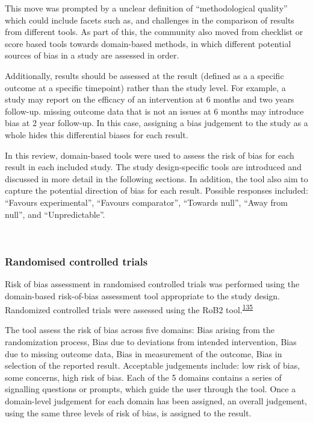 \documentclass[a4paper, twoside]{templates/ociamthesis}
\begin{document}
This move was prompted by a unclear definition of ``methodological quality'' which could include facets such as, and challenges in the comparison of results from different tools. As part of this, the community also moved from checklist or score based tools towards domain-based methods, in which different potential sources of bias in a study are assessed in order.

Additionally, results should be assessed at the result (defined as a a specific outcome at a specific timepoint) rather than the study level. For example, a study may report on the efficacy of an intervention at 6 months and two years follow-up. missing outcome data that is not an issues at 6 months may introduce bias at 2 year follow-up. In this case, assigning a bias judgement to the study as a whole hides this differential biases for each result.

In this review, domain-based tools were used to assess the risk of bias for each result in each included study. The study design-specific tools are introduced and discussed in more detail in the following sections. In addition, the tool also aim to capture the potential direction of bias for each result. Possible responses included: ``Favours experimental'', ``Favours comparator'', ``Towards null'', ``Away from null'', and ``Unpredictable''.

~

\hypertarget{randomised-controlled-trials-1}{%
\subsubsection{Randomised controlled trials}\label{randomised-controlled-trials-1}}

Risk of bias assessment in randomised controlled trials was performed using the domain-based risk-of-bias assessment tool appropriate to the study design. Randomized controlled trials were assessed using the RoB2 tool.\textsuperscript{\protect\hyperlink{ref-sterne2019}{135}}

The tool assess the risk of bias across five domains: Bias arising from the randomization process, Bias due to deviations from intended intervention, Bias due to missing outcome data, Bias in measurement of the outcome, Bias in selection of the reported result. Acceptable judgements include: low risk of bias, some concerns, high risk of bias. Each of the 5 domains contains a series of signalling questions or prompts, which guide the user through the tool. Once a domain-level judgement for each domain has been assigned, an overall judgement, using the same three levels of risk of bias, is assigned to the result.
\end{document}
